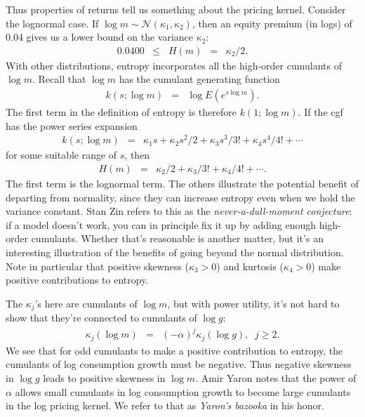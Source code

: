 \documentclass[11pt]{article}
\begin{document}
Thus properties of returns tell us something about the pricing kernel.
Consider the lognormal case.
If $\log m \sim \mathcal{N}(\kappa_1,\kappa_2)$, then an equity premium (in logs) of 0.04
gives us a lower bound on the variance $\kappa_2$:
\begin{eqnarray*}
    0.0400 \;\;\leq\;\; H(m) &=& \kappa_2/2.
\end{eqnarray*}
With other distributions, entropy incorporates all the high-order cumulants of $\log m$.
Recall that $\log m$ has the cumulant generating function
\begin{eqnarray*}
    k(s; \log m) &=& \log E \left( e^{s \log m} \right) .
\end{eqnarray*}
The first term in the definition of entropy is therefore $k(1; \log m)$.
If the cgf has the power series expansion
\begin{eqnarray*}
    k(s; \log m) &=& \kappa_1 s + \kappa_2 s^2/2 + \kappa_3 s^3 / 3! + \kappa_4 s^4/ 4! + \cdots
\end{eqnarray*}
for some suitable range of $s$,
then
\begin{eqnarray*}
    H(m)  &=& \kappa_2 /2 + \kappa_3 / 3! + \kappa_4 / 4! + \cdots .
\end{eqnarray*}
The first term is the lognormal term.
The others illustrate the potential benefit of departing from normality,
since they can increase entropy even when we hold the variance constant.
Stan Zin refers to this as the {\it never-a-dull-moment conjecture\/}:
if a model doesn't work, you can in principle fix it up by adding enough
high-order cumulants.
Whether that's reasonable is another matter, but it's an interesting
illustration of the benefits of going beyond the normal distribution.
Note in particular that positive skewness ($\kappa_3 > 0$) and kurtosis ($\kappa_4 > 0$)
make positive contributions to entropy.


The $\kappa_j$'s here are cumulants of $\log m$,
but with power utility, it's not hard to show that they're connected to cumulants
of $\log g$:
\begin{eqnarray*}
    \kappa_j (\log m) &=& (-\alpha)^j  \kappa_j (\log g), \;\;  j\geq 2.
\end{eqnarray*}
We see that for odd cumulants to make a positive contribution to entropy,
the cumulants of log consumption growth must be negative.
Thus negative skewness in $\log g$ leads to positive skewness in $\log m$.
Amir Yaron notes that the power of $\alpha$ allows small cumulants in log consumption growth
to become large cumulants in the log pricing kernel.
We refer to that as {\it Yaron's bazooka\/} in his honor.
\end{document}
